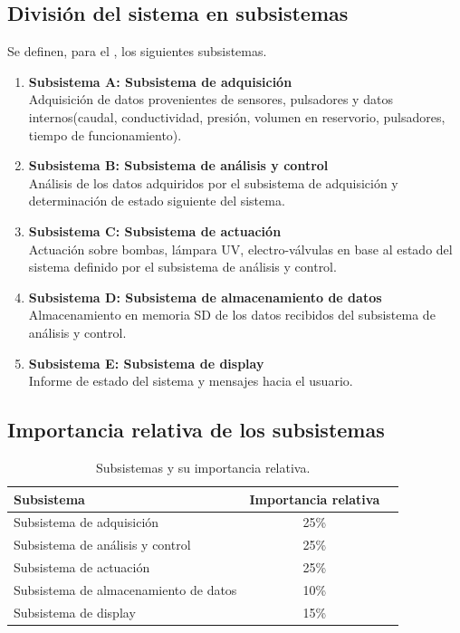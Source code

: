 \documentclass[
11pt, %
]{charter}
\begin{document}
\subsection{División del sistema en subsistemas}
Se definen, para el \ttitle, los siguientes subsistemas.
\begin{enumerate}
        \item \textbf{Subsistema A: Subsistema de adquisición}\\
        Adquisición de datos provenientes de sensores, pulsadores y datos internos(caudal, conductividad, presión, volumen en reservorio, pulsadores, tiempo de funcionamiento).
        \item \textbf{Subsistema B: Subsistema de análisis y control}\\
        Análisis de los datos adquiridos por el subsistema de adquisición y determinación de estado siguiente del sistema.
        \item \textbf{Subsistema C: Subsistema de actuación}\\
        Actuación sobre bombas, lámpara UV, electro-válvulas en base al estado del sistema definido por el subsistema de análisis y control.
        \item \textbf{Subsistema D: Subsistema de almacenamiento de datos}\\
        Almacenamiento en memoria SD de los datos recibidos del subsistema de análisis y control.
        \item \textbf{Subsistema E: Subsistema de display}\\
        Informe de estado del sistema y mensajes hacia el usuario.
\end{enumerate}

\subsection{Importancia relativa de los subsistemas}


\begin{table}[H]
\centering
\begin{tabular}{|l|c|c|}
\hline
\rowcolor[HTML]{C0C0C0}
Subsistema 							& Importancia relativa\\ \hline
Subsistema de adquisición								& 25\%						\\ \hline
Subsistema de análisis y control						& 25\%						\\ \hline
Subsistema de actuación									& 25\%						\\ \hline
Subsistema de almacenamiento de datos					& 10\%						\\ \hline
Subsistema de display									& 15\%						\\ \hline
\end{tabular}
\caption{\centering Subsistemas y su importancia relativa.}
\label{tab:subsistemas_importancia}
\end{table}
\end{document}

